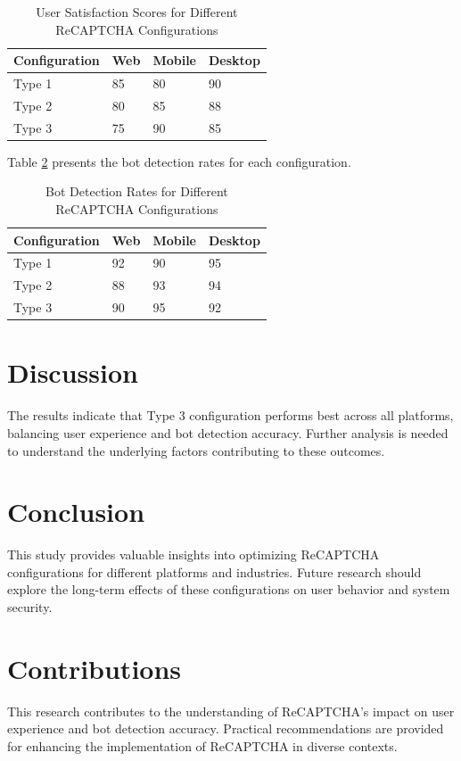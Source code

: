 \documentclass{article}
\begin{document}
\begin{table}[ht]
\centering
\caption{User Satisfaction Scores for Different ReCAPTCHA Configurations}
\label{tab:user_experience}
\begin{tabular}{@{}llll@{}}
\toprule
Configuration & Web & Mobile & Desktop \\ \midrule
Type 1         & 85  & 80    & 90      \\
Type 2         & 80  & 85    & 88      \\
Type 3         & 75  & 90    & 85      \\ \bottomrule
\end{tabular}
\end{table}

Table \ref{tab:bot_detection} presents the bot detection rates for each configuration.

\begin{table}[ht]
\centering
\caption{Bot Detection Rates for Different ReCAPTCHA Configurations}
\label{tab:bot_detection}
\begin{tabular}{@{}llll@{}}
\toprule
Configuration & Web & Mobile & Desktop \\ \midrule
Type 1         & 92  & 90    & 95      \\
Type 2         & 88  & 93    & 94      \\
Type 3         & 90  & 95    & 92      \\ \bottomrule
\end{tabular}
\end{table}

\section{Discussion}
The results indicate that Type 3 configuration performs best across all platforms, balancing user experience and bot detection accuracy. Further analysis is needed to understand the underlying factors contributing to these outcomes.

\section{Conclusion}
This study provides valuable insights into optimizing ReCAPTCHA configurations for different platforms and industries. Future research should explore the long-term effects of these configurations on user behavior and system security.

\section{Contributions}
This research contributes to the understanding of ReCAPTCHA's impact on user experience and bot detection accuracy. Practical recommendations are provided for enhancing the implementation of ReCAPTCHA in diverse contexts.
\end{document}
